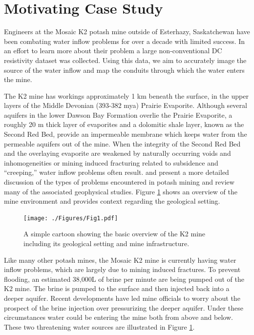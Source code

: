 \documentclass[final,authoryear,5p,times,twocolumn]{elsarticle}
\begin{document}
\section{Motivating Case Study}
\label{CaseStudy}

Engineers at the Mosaic K2 potash mine outside of Esterhazy, Saskatchewan have been combating water inflow problems for over a decade with limited success. In an effort to learn more about their problem a large non-conventional DC resistivity dataset was collected. Using this data, we aim to accurately image the source of the water inflow and map the conduits through which the water enters the mine.

The K2 mine has workings approximately 1 km beneath the surface, in the upper layers of the Middle Devonian (393-382 mya) Prairie Evaporite. Although several aquifers in the lower Dawson Bay Formation overlie the Prairie Evaporite, a roughly 20 m thick layer of evaporites and a dolomitic shale layer, known as the Second Red Bed, provide an impermeable membrane which keeps water from the permeable aquifers out of the mine. When the integrity of the Second Red Bed and the overlaying evaporite are weakened by naturally occurring voids and inhomogeneities or mining induced fracturing related to subsidence and ``creeping,'' water inflow problems often result. \cite{Gendzwill1992} and \cite{Chouteau1997} present a more detailed discussion of the types of problems encountered in potash mining and review many of the associated geophysical studies. Figure \ref{fig:Intro_ProblemCartoon} shows an overview of the mine environment and provides context regarding the geological setting.  

\begin{figure} [!ht]
    \begin{center}
       \texttt{[image: ./Figures/Fig1.pdf]}
    \end{center}
\caption{A simple cartoon showing the basic overview of the K2 mine including its geological setting and mine infrastructure.} 
\label{fig:Intro_ProblemCartoon}
\end{figure} 

Like many other potash mines, the Mosaic K2 mine is currently having water inflow problems, which are largely due to mining induced fractures. To prevent flooding, an estimated 38,000L of brine per minute are being pumped out of the K2 mine. The brine is pumped to the surface and then injected back into a deeper aquifer. Recent developments have led mine officials to worry about the prospect of the brine injection over pressurizing the deeper aquifer. Under these circumstances water could be entering the mine both from above and below. These two threatening water sources are illustrated in Figure \ref{fig:Intro_ProblemCartoon}.       
\end{document}
